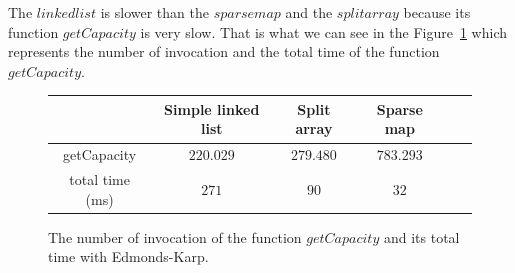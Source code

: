 The $linkedlist$ is slower than the $sparsemap$ and the $splitarray$ because its function $getCapacity$ is very slow. That is what we can see in the Figure~\ref{fig:ekcapa} which represents the number of invocation and the total time of the function $getCapacity$.

\begin{figure}[H]
\centering
\begin{tabular}{|c|c|c|c|c|c|}
	\hline
     & \textbf{Simple linked list} & \textbf{Split array} & \textbf{Sparse map}\\
     \hline	
   getCapacity & $220.029$ & $279.480$ & $783.293$ \\
   total time (ms) & $271$ & $90$ & $32$ \\
   \hline
\end{tabular}
\caption{The number of invocation of the function $getCapacity$ and its total time with Edmonds-Karp.}
\label{fig:ekcapa}
\end{figure}


